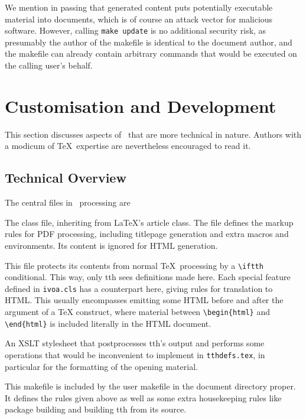 \documentclass[11pt,a4paper]{ivoa}
\begin{document}
We mention in passing that generated content puts potentially executable
material into documents, which is of course an attack vector for
malicious software.  However, calling \texttt{make update} is no
additional security risk, as presumably the author of the makefile is
identical to the document author, and the makefile can already contain
arbitrary commands that would be executed on the calling user's behalf.

\section{Customisation and Development}
\label{sect:impl}

This section discusses aspects of \ivoatex\ that are more technical in
nature.  Authors with a modicum of \TeX\ expertise are nevertheless
encouraged to read it.

\subsection{Technical Overview}

The central files in \ivoatex\ processing are

\begin{bigdescription}
\item[ivoa.cls] The class file, inheriting from \LaTeX's article class.
The file defines the markup rules for PDF processing, including
titlepage generation and extra macros and environments.  Its content is
ignored for HTML generation.

\item[tthdefs.tex] This file protects its contents from normal \TeX\
processing by a \verb|\iftth| conditional. This way, only tth sees
definitions made here. Each special feature defined in \texttt{ivoa.cls}
has a counterpart here, giving rules for translation to HTML.  This
usually encompasses emitting some HTML before and after the argument of
a TeX construct, where material between \verb|\begin{html}| and
\verb|\end{html}| is included literally in the HTML document.

\item[tth-ivoa.xslt] An XSLT stylesheet that postprocesses tth's output
and performs some operations that would be inconvenient to implement in
\texttt{tthdefs.tex}, in particular for the formatting of the opening
material.

\item[Makefile] This makefile is included by the user makefile in the
document directory proper.  It defines the rules given above as well as
some extra housekeeping rules like package building and building tth
from its source.

\end{bigdescription}
\end{document}
